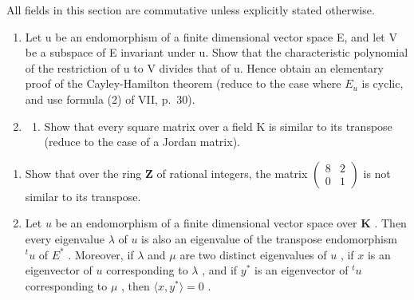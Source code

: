 \BourbakiExerciseGroup

All fields in this section are commutative unless explicitly stated otherwise.

\begin{enumerate}
\def\labelenumi{\arabic{enumi})}
\item
  Let u be an endomorphism of a finite dimensional vector space E, and let V be a subspace of E invariant under u. Show that the characteristic polynomial of the restriction of u to V divides that of u. Hence obtain an elementary proof of the Cayley-Hamilton theorem (reduce to the case where \(E_{u}\) is cyclic, and use formula (2) of VII, p.~30).
\item
  \begin{enumerate}
  \def\labelenumii{\alph{enumii})}
  \tightlist
  \item
    Show that every square matrix over a field K is similar to its transpose (reduce to the case of a Jordan matrix).
  \end{enumerate}
\end{enumerate}

\begin{enumerate}
\def\labelenumi{\alph{enumi})}
\setcounter{enumi}{1}
\item
  Show that over the ring \(\mathbf{Z}\) of rational integers, the matrix \(\begin{pmatrix} 8 & 2 \\ 0 & 1 \end{pmatrix}\) is not similar to its transpose.
\item
  Let \(u\) be an endomorphism of a finite dimensional vector space over \(\mathbf{K}\) . Then every eigenvalue \(\lambda\) of \(u\) is also an eigenvalue of the transpose endomorphism \(^t u\) of \(E^*\) . Moreover, if \(\lambda\) and \(\mu\) are two distinct eigenvalues of \(u\) , if \(x\) is an eigenvector of \(u\) corresponding to \(\lambda\) , and if \(y^*\) is an eigenvector of \(^t u\) corresponding to \(\mu\) , then \(\langle x, y^* \rangle = 0\) .
\end{enumerate}

